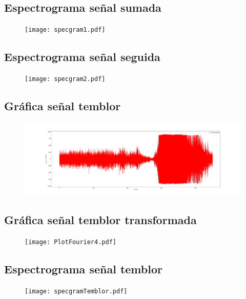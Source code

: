 \documentclass[11pt,letterpaper]{exam}
\begin{document}
\subsection{Espectrograma señal sumada}
\begin{figure}[H]
\centering
\texttt{[image: specgram1.pdf]}
\end{figure}

\subsection{Espectrograma señal seguida}
\begin{figure}[H]
\centering
\texttt{[image: specgram2.pdf]}
\end{figure}

\subsection{Gráfica señal temblor}
\begin{figure}[H]
\centering
\includegraphics[scale=0.25]{PlotFourier3.pdf}
\end{figure}

\subsection{Gráfica señal temblor transformada}
\begin{figure}[H]
\centering
\texttt{[image: PlotFourier4.pdf]}
\end{figure}

\subsection{Espectrograma señal temblor}
\begin{figure}[H]
\centering
\texttt{[image: specgramTemblor.pdf]}
\end{figure}
\end{document}
